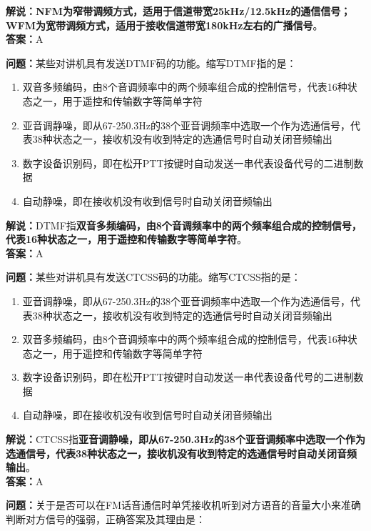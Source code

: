 \textbf{解说：NFM为窄带调频方式，适用于信道带宽25kHz/12.5kHz的通信信号；WFM为宽带调频方式，适用于接收信道带宽180kHz左右的广播信号}。\\\textbf{答案：}A%



\textbf{问题：}某些对讲机具有发送DTMF码的功能。缩写DTMF指的是：

\begin{enumerate}[label=\Alph*), leftmargin=1cm]
	\item 双音多频编码，由8个音调频率中的两个频率组合成的控制信号，代表16种状态之一，用于遥控和传输数字等简单字符
	\item 亚音调静噪，即从67-250.3Hz的38个亚音调频率中选取一个作为选通信号，代表38种状态之一，接收机没有收到特定的选通信号时自动关闭音频输出
	\item 数字设备识别码，即在松开PTT按键时自动发送一串代表设备代号的二进制数据
	\item 自动静噪，即在接收机没有收到信号时自动关闭音频输出
\end{enumerate}

\textbf{解说：}DTMF指\textbf{双音多频编码，由8个音调频率中的两个频率组合成的控制信号，代表16种状态之一，用于遥控和传输数字等简单字符}。\\\textbf{答案：}A%



\textbf{问题：}某些对讲机具有发送CTCSS码的功能。缩写CTCSS指的是：

\begin{enumerate}[label=\Alph*), leftmargin=1cm]
	\item 亚音调静噪，即从67-250.3Hz的38个亚音调频率中选取一个作为选通信号，代表38种状态之一，接收机没有收到特定的选通信号时自动关闭音频输出
	\item 双音多频编码，由8个音调频率中的两个频率组合成的控制信号，代表16种状态之一，用于遥控和传输数字等简单字符
	\item 数字设备识别码，即在松开PTT按键时自动发送一串代表设备代号的二进制数据
	\item 自动静噪，即在接收机没有收到信号时自动关闭音频输出
\end{enumerate}

\textbf{解说：}CTCSS指\textbf{亚音调静噪，即从67-250.3Hz的38个亚音调频率中选取一个作为选通信号，代表38种状态之一，接收机没有收到特定的选通信号时自动关闭音频输出}。\\\textbf{答案：}A%



\textbf{问题：}关于是否可以在FM话音通信时单凭接收机听到对方语音的音量大小来准确判断对方信号的强弱，正确答案及其理由是：

